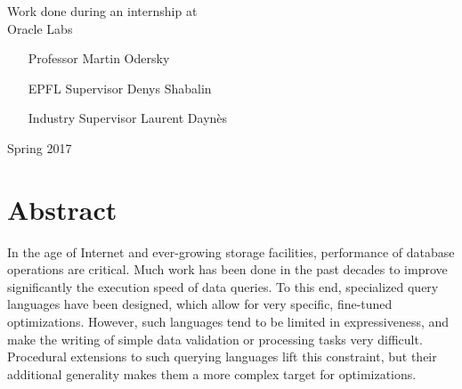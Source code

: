 \documentclass[twoside,11pt,a4paper]{article}
\begin{document}
\begin{titlepage}
\begin{center}
		\vfill       
		\normalsize
        Work done during an internship at\\
        \vspace{0.2cm}
        \Large Oracle Labs \large
        
        \vspace{0.3cm}
        
        
        
        
		\begin{itemize}
		\centering
		\item[Professor] Martin Odersky
		\item[EPFL Supervisor] Denys Shabalin
		\item[Industry Supervisor] Laurent Daynès
		\end{itemize}
        
	    \vspace{0.3cm}
    
		Spring 2017
		
	    \end{center}
	
\end{titlepage}

\cleardoublepage

\vspace*{1cm}
\section*{\hfil Abstract\hfil}
\label{sec:abstract}

\vspace{0.5cm}

In the age of Internet and ever-growing storage facilities, performance of database operations are critical. Much work has been done in the past decades to improve significantly the execution speed of data queries. To this end, specialized query languages have been designed, which allow for very specific, fine-tuned optimizations. However, such languages tend to be limited in expressiveness, and make the writing of simple data validation or processing tasks very difficult. Procedural extensions to such querying languages lift this constraint, but their additional generality makes them a more complex target for optimizations.
\end{document}
